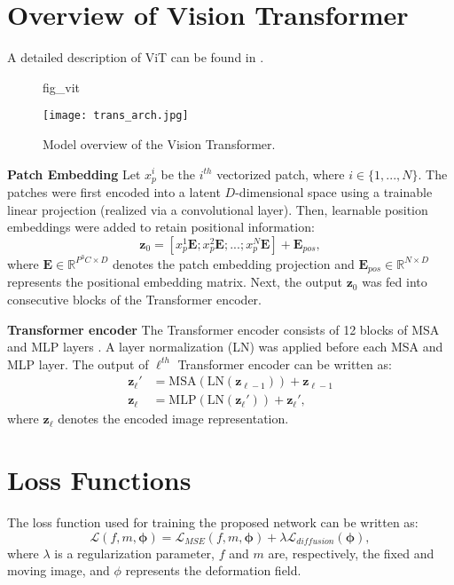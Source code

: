 \documentclass{midl}
\begin{document}



\newpage
\appendix
\section{Overview of Vision Transformer}
A detailed description of ViT can be found in \cite{dosovitskiy2020image, vaswani2017attention, chen2021transunet}.
\label{ViT_overview}
\begin{figure}[!h]
\floatconts
{fig_vit}
  {\caption{Model overview of the Vision Transformer.}}
  {\texttt{[image: trans\_arch.jpg]}}
\end{figure}

\noindent\textbf{Patch Embedding}
Let $x_p^i$ be the $i^{th}$ vectorized patch, where $i\in\{1,...,N\}$. The patches were first encoded into a latent $D$-dimensional space using a trainable linear projection (realized via a convolutional layer). Then, learnable position embeddings were added to retain positional information:
\begin{equation}
    \mathbf{z}_0 = [x_p^1\mathbf{E};x_p^2\mathbf{E};...;x_p^N\mathbf{E}]+\mathbf{E}_{pos},
\end{equation}
where $\mathbf{E}\in\mathbb{R}^{P^3C\times D}$ denotes the patch embedding projection and $\mathbf{E}_{pos}\in\mathbb{R}^{N\times D}$ represents the positional embedding matrix. Next, the output $\mathbf{z}_0$ was fed into consecutive blocks of the Transformer encoder.

\noindent\textbf{Transformer encoder} The Transformer encoder consists of 12 blocks of MSA and MLP layers \cite{vaswani2017attention}. A layer normalization (LN) was applied before each MSA and MLP layer. The output of $\ell^{th}$ Transformer encoder can be written as:
\begin{equation}
\begin{split}
    \mathbf{z}_\ell'&= \text{MSA}(\text{LN}(\mathbf{z}_{\ell-1})) + \mathbf{z}_{\ell-1}\\
    \mathbf{z}_\ell&= \text{MLP}(\text{LN}(\mathbf{z}_\ell')) + \mathbf{z}_\ell',
\end{split}
\end{equation}
where $\mathbf{z}_\ell$ denotes the encoded image representation.

\section{Loss Functions}
\label{Loss}
The loss function used for training the proposed network can be written as:
\begin{equation}
    \mathcal{L}(f, m, \mathbf{\phi}) = \mathcal{L}_{MSE}(f, m, \mathbf{\phi}) + \lambda\mathcal{L}_{diffusion}(\mathbf{\phi}),
\end{equation}
where $\lambda$ is a regularization parameter, $f$ and $m$ are, respectively, the fixed and moving image, and $\mathcal{\phi}$ represents the deformation field.
\end{document}
